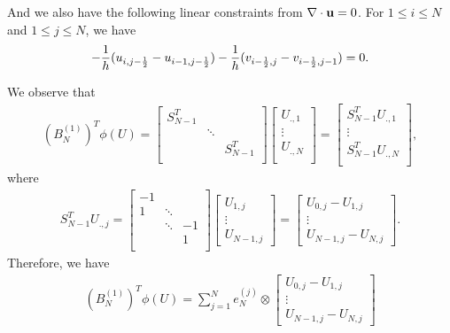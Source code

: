\documentclass[english]{pkupaper}
\newenvironment{eqt}{\begin{equation}\begin{aligned}}{\end{aligned}\end{equation}}
\begin{document}
And we also have the following linear constraints from $\nabla \cdot \mathbf{u}=0$. For $1\leq i\leq N$ and $1\leq j\leq N$, we have
\begin{eqt}
\label{divu}
-\frac{1}{h}(u_{i,j-\oot}-u_{i-1,j-\oot})-\frac{1}{h}(v_{i-\oot,j}-v_{i-\oot,j-1})=0.
\end{eqt}

We observe that 
\begin{eqt}
(B_N^{(1)})^T\phi(U)=\begin{bmatrix}
S_{N-1}^T\\
&\ddots\\
&&S_{N-1}^T\\
\end{bmatrix}
\begin{bmatrix}
U_{.,1}\\
\vdots\\
U_{.,N}\\
\end{bmatrix}=\begin{bmatrix}
S_{N-1}^TU_{.,1}\\
\vdots\\
S_{N-1}^TU_{.,N}\\
\end{bmatrix},
\end{eqt}
where
\begin{eqt}
S_{N-1}^TU_{.,j}=\begin{bmatrix}
-1\\
1&\ddots\\
&\ddots&-1\\
&&1\\
\end{bmatrix}
\begin{bmatrix}
U_{1,j}\\
\vdots\\
U_{N-1,j}
\end{bmatrix}=\begin{bmatrix}
U_{0,j}-U_{1,j}\\
\vdots\\
U_{N-1,j}-U_{N,j}
\end{bmatrix}.
\end{eqt}
Therefore, we have
\begin{eqt}
\label{bn1t}
(B_N^{(1)})^T\phi(U)= \sum_{j=1}^Ne_N^{(j)}\otimes\begin{bmatrix}
U_{0,j}-U_{1,j}\\
\vdots\\
U_{N-1,j}-U_{N,j}
\end{bmatrix}
\end{eqt}
\end{document}

